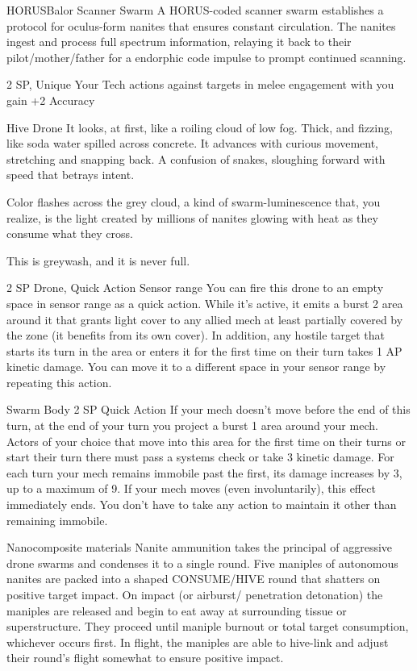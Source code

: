 \begin{mech}{HORUS}{Balor}
Scanner Swarm
A HORUS-coded scanner swarm establishes a protocol for oculus-form nanites that ensures constant circulation. The nanites ingest and process full spectrum information, relaying it back to their pilot/mother/father for a endorphic code impulse to prompt continued scanning.

2 SP, Unique
Your Tech actions against targets in melee engagement with you gain +2 Accuracy

Hive Drone
It looks, at first, like a roiling cloud of low fog. Thick, and fizzing, like soda water spilled across concrete. It advances with curious movement, stretching and snapping back. A confusion of snakes, sloughing forward with speed that betrays intent.

Color flashes across the grey cloud, a kind of swarm-luminescence that, you realize, is the light created by millions of nanites glowing with heat as they consume what they cross.

This is greywash, and it is never full.

2 SP
Drone, Quick Action
Sensor range
You can fire this drone to an empty space in sensor range as a quick action. While it’s active, it emits a burst 2 area around it that grants light cover to any allied mech at least partially covered by the zone (it benefits from its own cover). In addition, any hostile target that starts its turn in the area or enters it for the first time on their turn takes 1 AP kinetic damage. You can move it to a different space in your sensor range by repeating this action.

Swarm Body
2 SP
Quick Action
If your mech doesn’t move before the end of this turn, at the end of your turn you project a burst 1 area around your mech. Actors of your choice that move into this area for the first time on their turns or start their turn there must pass a systems check or take 3 kinetic damage. For each turn your mech remains immobile past the first, its damage increases by 3, up to a maximum of 9. If your mech moves (even involuntarily), this effect immediately ends. You don’t have to take any action to maintain it other than remaining immobile.

Nanocomposite materials
Nanite ammunition takes the principal of aggressive drone swarms and condenses it to a single round. Five maniples of autonomous nanites are packed into a shaped CONSUME/HIVE round that shatters on positive target impact. On impact (or airburst/ penetration detonation) the maniples are released and begin to eat away at surrounding tissue or superstructure. They proceed until maniple burnout or total target consumption, whichever occurs first. In flight, the maniples are able to hive-link and adjust their round’s flight somewhat to ensure positive impact.


\end{mech}
